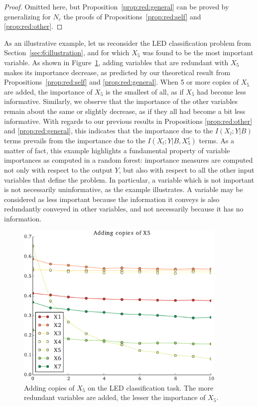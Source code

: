 \begin{proof}
Omitted here, but Proposition~\ref{prop:red:general} can be proved
by generalizing for $N_c$ the proofs of Propositions~\ref{prop:red:self}
and \ref{prop:red:other}.
\end{proof}

As an illustrative example, let us reconsider the LED classification problem
from Section~\ref{sec:6:illustration}, and for which $X_5$ was found to be the
most important variable. As shown in Figure~\ref{fig:7:red:led}, adding
variables that are redundant with $X_5$ makes its importance decrease, as
predicted by our theoretical result from Propositions~\ref{prop:red:self} and
\ref{prop:red:general}. When 5 or more copies of $X_5$ are added, the
importance of $X_5$ is the smallest of all, as if $X_5$ had become less
informative. Similarly, we observe that the importance of the other variables
remain about the same or slightly decrease, as if they all had become a bit
less informative. With regards to our previous results in Propositions
\ref{prop:red:other} and \ref{prop:red:general}, this indicates that the
importance due to the $I(X_l;Y|B)$ terms prevails from  the importance due to
the $I(X_l;Y|B,X_5^c)$ terms. As a matter of fact, this example highlights a
fundamental property of variable importances as computed in a random forest:
importance measures are computed not only with respect to the output $Y$, but
also with respect to all the other input variables that define the problem. In
particular, a variable which is not important is not necessarily uninformative,
as the example illustrates. A variable may be considered as less important
because the  information it conveys is also redundantly conveyed in other
variables, and not necessarily because it has no information.

\begin{figure}
\centering
\includegraphics[width=0.9\textwidth]{figures/ch7_red_led.pdf}
\caption{Adding copies of $X_5$ on the LED classification task. The more
         redundant variables are added, the lesser the importance of $X_5$.}
\label{fig:7:red:led}
\end{figure}


